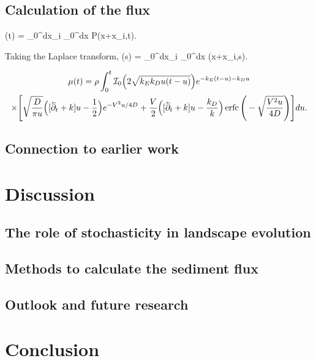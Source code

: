 \subsection{Calculation of the flux}
\be \mu(t) = \rho \int_0^\infty dx_i \int_0^\infty dx P(x+x_i,t).\ee

Taking the Laplace transform,
\be \tilde{\mu}(s) = \rho \int_0^\infty dx_i \int_0^\infty dx (x+x_i,s).\ee


\begin{multline} 
	\mu(t) = \rho \int_0^t \mathcal{I}_0\Big(2\sqrt{k_Ek_Du(t-u)}\Big)e^{-k_E(t-u)-k_D u} \\
	\times \Bigg[\sqrt{\frac{D}{\pi u}}\Big([\cev{\partial_t} + k]u-\frac{1}{2}\Big)e^{-V^2 u/4D} + \frac{V}{2}\Big([\cev{\partial_t} + k]u -\frac{k_D}{k}\Big) \erfc\Bigg(-\sqrt{\frac{V^2 u}{4D}}\Bigg)\Bigg] du.
\end{multline}
\subsection{Connection to earlier work}
\section{Discussion \label{sec:disc}}
\subsection{The role of stochasticity in landscape evolution}
\subsection{Methods to calculate the sediment flux}
\subsection{Outlook and future research}
\section{Conclusion \label{sec:conc}}
